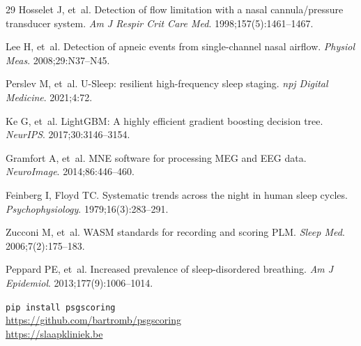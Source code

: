 \documentclass[11pt,a4paper]{article}
\begin{document}
\begin{thebibliography}{29}
Hosselet J, et~al. Detection of flow limitation with a nasal
cannula/pressure transducer system. \emph{Am J Respir Crit Care Med}.
1998;157(5):1461--1467.

Lee H, et~al. Detection of apneic events from single-channel nasal
airflow. \emph{Physiol Meas}. 2008;29:N37--N45.

Perslev M, et~al. U-Sleep: resilient high-frequency sleep staging.
\emph{npj Digital Medicine}. 2021;4:72.

Ke G, et~al. LightGBM: A highly efficient gradient boosting decision
tree. \emph{NeurIPS}. 2017;30:3146--3154.

Gramfort A, et~al. MNE software for processing MEG and EEG data.
\emph{NeuroImage}. 2014;86:446--460.

Feinberg I, Floyd TC. Systematic trends across the night in human
sleep cycles. \emph{Psychophysiology}. 1979;16(3):283--291.

Zucconi M, et~al. WASM standards for recording and scoring PLM.
\emph{Sleep Med}. 2006;7(2):175--183.

Peppard PE, et~al. Increased prevalence of sleep-disordered breathing.
\emph{Am J Epidemiol}. 2013;177(9):1006--1014.

\end{thebibliography}

\vspace{1cm}
\noindent\texttt{pip install psgscoring}\\
\url{https://github.com/bartromb/psgscoring}\\
\url{https://slaapkliniek.be}
\end{document}
